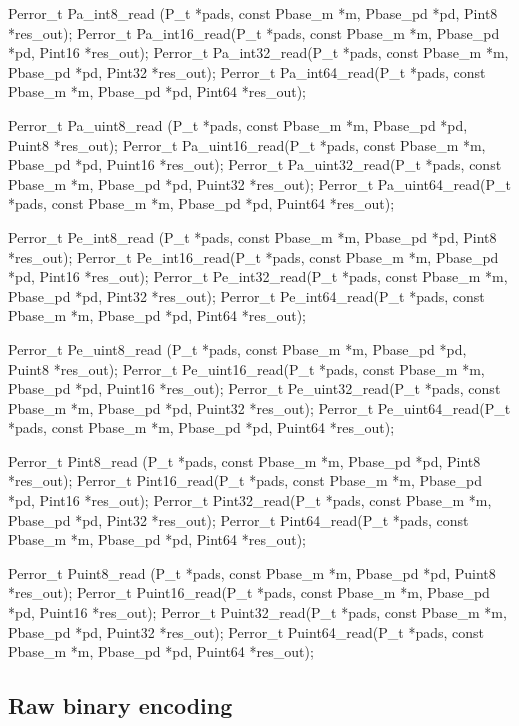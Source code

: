 \begin{tinycodeaux}{\leftmargin=0in}
\codeallowbreaks
Perror_t Pa_int8_read (P_t *pads, const Pbase_m *m,
		       Pbase_pd *pd, Pint8 *res_out);
Perror_t Pa_int16_read(P_t *pads, const Pbase_m *m,
		       Pbase_pd *pd, Pint16 *res_out);
Perror_t Pa_int32_read(P_t *pads, const Pbase_m *m,
		       Pbase_pd *pd, Pint32 *res_out);
Perror_t Pa_int64_read(P_t *pads, const Pbase_m *m,
		       Pbase_pd *pd, Pint64 *res_out);

Perror_t Pa_uint8_read (P_t *pads, const Pbase_m *m,
			Pbase_pd *pd, Puint8 *res_out);
Perror_t Pa_uint16_read(P_t *pads, const Pbase_m *m,
			Pbase_pd *pd, Puint16 *res_out);
Perror_t Pa_uint32_read(P_t *pads, const Pbase_m *m,
			Pbase_pd *pd, Puint32 *res_out);
Perror_t Pa_uint64_read(P_t *pads, const Pbase_m *m,
			Pbase_pd *pd, Puint64 *res_out);

Perror_t Pe_int8_read (P_t *pads, const Pbase_m *m,
		       Pbase_pd *pd, Pint8 *res_out);
Perror_t Pe_int16_read(P_t *pads, const Pbase_m *m,
		       Pbase_pd *pd, Pint16 *res_out);
Perror_t Pe_int32_read(P_t *pads, const Pbase_m *m,
		       Pbase_pd *pd, Pint32 *res_out);
Perror_t Pe_int64_read(P_t *pads, const Pbase_m *m,
		       Pbase_pd *pd, Pint64 *res_out);

Perror_t Pe_uint8_read (P_t *pads, const Pbase_m *m,
			Pbase_pd *pd, Puint8 *res_out);
Perror_t Pe_uint16_read(P_t *pads, const Pbase_m *m,
			Pbase_pd *pd, Puint16 *res_out);
Perror_t Pe_uint32_read(P_t *pads, const Pbase_m *m,
			Pbase_pd *pd, Puint32 *res_out);
Perror_t Pe_uint64_read(P_t *pads, const Pbase_m *m,
			Pbase_pd *pd, Puint64 *res_out);

Perror_t Pint8_read (P_t *pads, const Pbase_m *m,
		     Pbase_pd *pd, Pint8 *res_out);
Perror_t Pint16_read(P_t *pads, const Pbase_m *m,
		     Pbase_pd *pd, Pint16 *res_out);
Perror_t Pint32_read(P_t *pads, const Pbase_m *m,
		     Pbase_pd *pd, Pint32 *res_out);
Perror_t Pint64_read(P_t *pads, const Pbase_m *m,
		     Pbase_pd *pd, Pint64 *res_out);

Perror_t Puint8_read (P_t *pads, const Pbase_m *m,
		      Pbase_pd *pd, Puint8 *res_out);
Perror_t Puint16_read(P_t *pads, const Pbase_m *m,
		      Pbase_pd *pd, Puint16 *res_out);
Perror_t Puint32_read(P_t *pads, const Pbase_m *m,
		      Pbase_pd *pd, Puint32 *res_out);
Perror_t Puint64_read(P_t *pads, const Pbase_m *m,
		      Pbase_pd *pd, Puint64 *res_out);
\end{tinycodeaux}

\subsection{Raw binary encoding}


